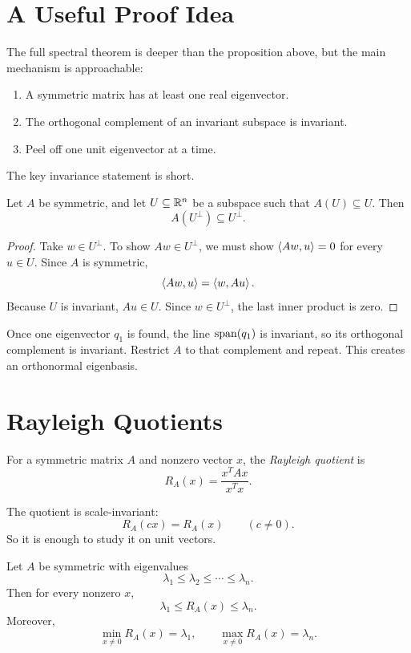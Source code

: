 \section{A Useful Proof Idea}

The full spectral theorem is deeper than the proposition above, but the main
mechanism is approachable:

\begin{enumerate}
  \item A symmetric matrix has at least one real eigenvector.
  \item The orthogonal complement of an invariant subspace is invariant.
  \item Peel off one unit eigenvector at a time.
\end{enumerate}

The key invariance statement is short.

\begin{lemma}
Let $A$ be symmetric, and let $U\subseteq\mathbb{R}^n$ be a subspace such that
$A(U)\subseteq U$. Then
\[
  A(U^\perp)\subseteq U^\perp.
\]
\end{lemma}

\begin{proof}
Take $w\in U^\perp$. To show $Aw\in U^\perp$, we must show
$\left\langle Aw,u \right\rangle=0$ for every $u\in U$. Since $A$ is symmetric,
\[
  \left\langle Aw,u \right\rangle=\left\langle w,Au \right\rangle.
\]
Because $U$ is invariant, $Au\in U$. Since $w\in U^\perp$, the last inner
product is zero.
\end{proof}

Once one eigenvector $q_1$ is found, the line $\operatorname{span}(q_1)$ is invariant, so
its orthogonal complement is invariant. Restrict $A$ to that complement and
repeat. This creates an orthonormal eigenbasis.

\section{Rayleigh Quotients}

\begin{definition}
For a symmetric matrix $A$ and nonzero vector $x$, the \emph{Rayleigh quotient}
is
\[
  R_A(x)=\frac{x^TAx}{x^Tx}.
\]
\end{definition}

The quotient is scale-invariant:
\[
  R_A(cx)=R_A(x)
  \qquad(c\neq 0).
\]
So it is enough to study it on unit vectors.

\begin{theorem}
Let $A$ be symmetric with eigenvalues
\[
  \lambda_1\leq \lambda_2\leq \cdots \leq \lambda_n.
\]
Then for every nonzero $x$,
\[
  \lambda_1\leq R_A(x)\leq \lambda_n.
\]
Moreover,
\[
  \min_{x\neq 0} R_A(x)=\lambda_1,
  \qquad
  \max_{x\neq 0} R_A(x)=\lambda_n.
\]
\end{theorem}

